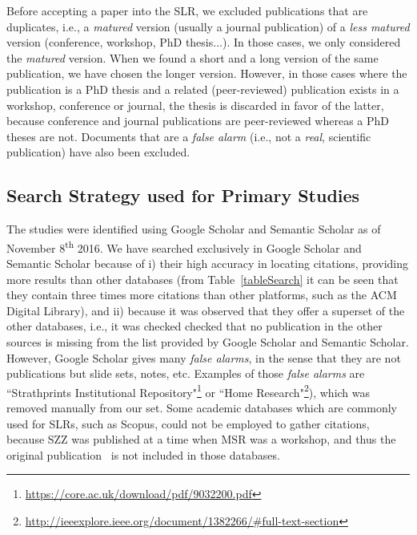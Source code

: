 \documentclass[a4paper, 12pt]{book}
\begin{document}
Before accepting a paper into the SLR, we excluded publications that are duplicates, i.e., a \emph{matured} version (usually a journal publication) of a \emph{less matured} version (conference, workshop, PhD thesis...). In those cases, we only considered the \emph{matured} version. When we found a short and a long version of the same publication, we have chosen the longer version.  However, in those cases where the publication is a PhD thesis and a related (peer-reviewed) publication exists in a workshop, conference or journal, the thesis is discarded in favor of the latter, because conference and journal publications are peer-reviewed whereas a PhD theses are not. Documents that are a \emph{false alarm} (i.e., not a \emph{real}, scientific publication) have also been excluded.

\subsection{Search Strategy used for Primary Studies}
\label{subsec:strategy}

The studies were identified using Google Scholar and Semantic Scholar as of November 8\textsuperscript{th} 2016. We have searched exclusively in Google Scholar and Semantic Scholar because of i) their high accuracy in locating citations, providing more results than other databases (from Table~\ref{tableSearch} it can be seen that they contain three times more citations than other platforms, such as the ACM Digital Library), and ii) because it was observed that they offer a superset of the other databases, i.e., it was checked checked that no publication in the other sources is missing from the list provided by Google Scholar and Semantic Scholar. However, Google Scholar gives many \emph{false alarms}, in the sense that they are not publications but slide sets, notes, etc. Examples of those \emph{false alarms} are ``Strathprints Institutional Repository"\footnote{\url{https://core.ac.uk/download/pdf/9032200.pdf}} or ``Home Research"\footnote{\url{http://ieeexplore.ieee.org/document/1382266/\#full-text-section}}), which was removed manually from our set. Some academic databases which are commonly used for SLRs, such as Scopus, could not be employed to gather citations, because SZZ was published at a time when MSR was a workshop, and thus the original publication~\cite{sliwerski2005changes} is not included in those databases.
\end{document}
